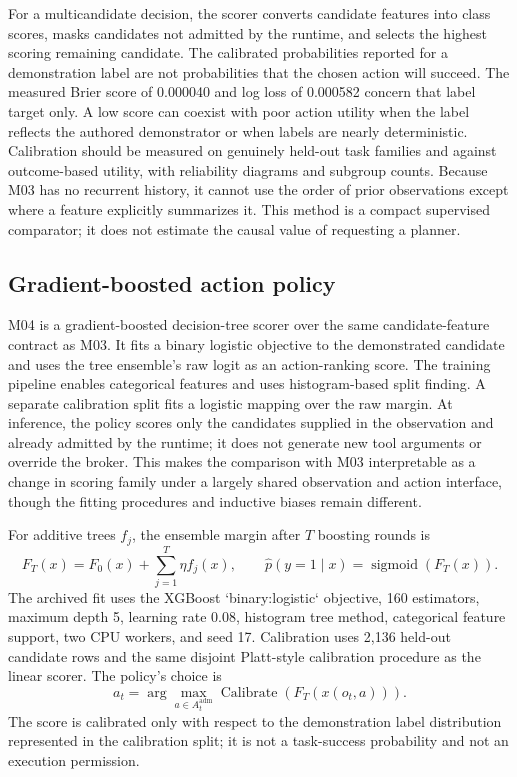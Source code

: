 For a multicandidate decision, the scorer converts candidate features into class scores, masks candidates not admitted by the runtime, and selects the highest scoring remaining candidate. The calibrated probabilities reported for a demonstration label are not probabilities that the chosen action will succeed. The measured Brier score of 0.000040 and log loss of 0.000582 concern that label target only. A low score can coexist with poor action utility when the label reflects the authored demonstrator or when labels are nearly deterministic. Calibration should be measured on genuinely held-out task families and against outcome-based utility, with reliability diagrams and subgroup counts. Because M03 has no recurrent history, it cannot use the order of prior observations except where a feature explicitly summarizes it. This method is a compact supervised comparator; it does not estimate the causal value of requesting a planner.

\subsection{Gradient-boosted action policy}\label{sec:method-m04}
M04 is a gradient-boosted decision-tree scorer over the same candidate-feature contract as M03. It fits a binary logistic objective to the demonstrated candidate and uses the tree ensemble's raw logit as an action-ranking score. The training pipeline enables categorical features and uses histogram-based split finding. A separate calibration split fits a logistic mapping over the raw margin. At inference, the policy scores only the candidates supplied in the observation and already admitted by the runtime; it does not generate new tool arguments or override the broker. This makes the comparison with M03 interpretable as a change in scoring family under a largely shared observation and action interface, though the fitting procedures and inductive biases remain different.

For additive trees $f_j$, the ensemble margin after $T$ boosting rounds is
\begin{equation}
F_T(x)=F_0(x)+\sum_{j=1}^{T}\eta f_j(x),\qquad
\widehat p(y=1\mid x)=\operatorname{sigmoid}(F_T(x)).
\end{equation}
The archived fit uses the XGBoost `binary:logistic` objective, 160 estimators, maximum depth 5, learning rate $0.08$, histogram tree method, categorical feature support, two CPU workers, and seed 17. Calibration uses 2,136 held-out candidate rows and the same disjoint Platt-style calibration procedure as the linear scorer. The policy's choice is
\begin{equation}
a_t=\arg\max_{a\in A_t^{\mathrm{adm}}}\operatorname{Calibrate}(F_T(x(o_t,a))).
\end{equation}
The score is calibrated only with respect to the demonstration label distribution represented in the calibration split; it is not a task-success probability and not an execution permission.


